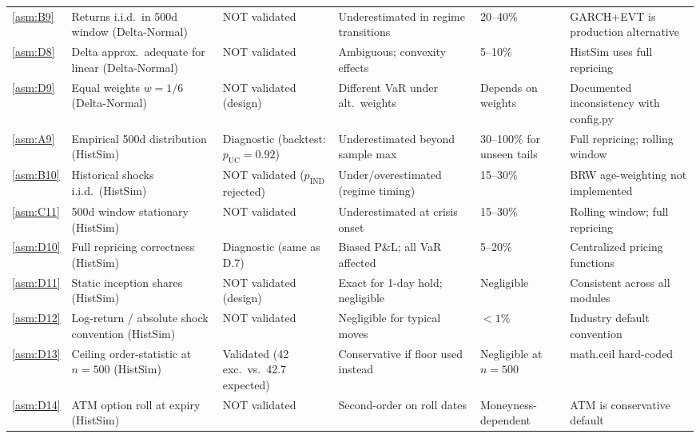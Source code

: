 \documentclass[11pt,a4paper]{article}
\begin{document}
\begin{footnotesize}
\begin{longtable}{@{}p{0.65cm} p{4.0cm} p{2.6cm} p{3.4cm} p{2.0cm} p{2.8cm}@{}}
\cref{asm:B9}  & Returns i.i.d.\ in 500d window (Delta-Normal) & NOT validated & Underestimated in regime transitions & 20--40\% & GARCH+EVT is production alternative \\[4pt]

\cref{asm:D8}  & Delta approx.\ adequate for linear (Delta-Normal) & NOT validated & Ambiguous; convexity effects & 5--10\% & HistSim uses full repricing \\[4pt]

\cref{asm:D9}  & Equal weights $w=1/6$ (Delta-Normal) & NOT validated (design) & Different VaR under alt.\ weights & Depends on weights & Documented inconsistency with config.py \\[4pt]

\cref{asm:A9}  & Empirical 500d distribution (HistSim) & Diagnostic (backtest: $p_\mathrm{UC}=0.92$) & Underestimated beyond sample max & 30--100\% for unseen tails & Full repricing; rolling window \\[4pt]

\cref{asm:B10} & Historical shocks i.i.d.\ (HistSim) & NOT validated ($p_\mathrm{IND}$ rejected) & Under/overestimated (regime timing) & 15--30\% & BRW age-weighting not implemented \\[4pt]

\cref{asm:C11} & 500d window stationary (HistSim) & NOT validated & Underestimated at crisis onset & 15--30\% & Rolling window; full repricing \\[4pt]

\cref{asm:D10} & Full repricing correctness (HistSim) & Diagnostic (same as D.7) & Biased P\&L; all VaR affected & 5--20\% & Centralized pricing functions \\[4pt]

\cref{asm:D11} & Static inception shares (HistSim) & NOT validated (design) & Exact for 1-day hold; negligible & Negligible & Consistent across all modules \\[4pt]

\cref{asm:D12} & Log-return / absolute shock convention (HistSim) & NOT validated & Negligible for typical moves & $<1\%$ & Industry default convention \\[4pt]

\cref{asm:D13} & Ceiling order-statistic at $n=500$ (HistSim) & Validated (42 exc.\ vs.\ 42.7 expected) & Conservative if floor used instead & Negligible at $n=500$ & math.ceil hard-coded \\[4pt]

\cref{asm:D14} & ATM option roll at expiry (HistSim) & NOT validated & Second-order on roll dates & Moneyness-dependent & ATM is conservative default \\[4pt]


\end{longtable}
\end{footnotesize}
\end{document}
